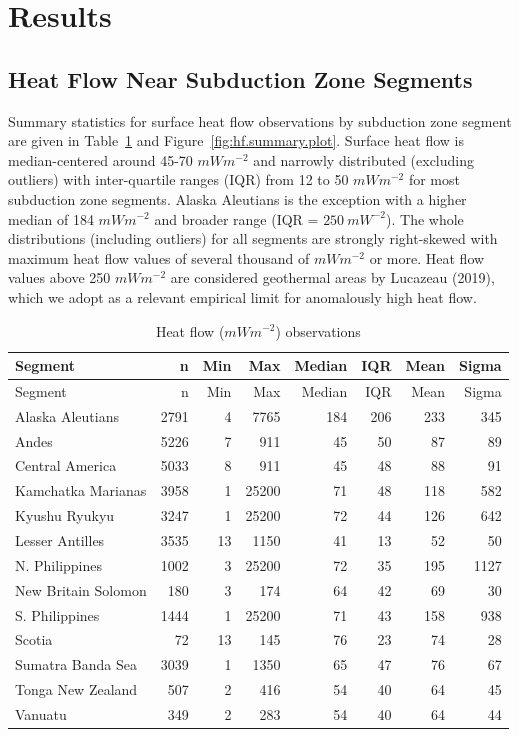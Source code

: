 \documentclass[draft,linenumbers]{agujournal2018}
\begin{document}
\section{Results}

\subsection{Heat Flow Near Subduction Zone Segments}

Summary statistics for surface heat flow observations by subduction zone
segment are given in Table~\ref{tbl:hf.summary.table} and
Figure~\ref{fig:hf.summary.plot}. Surface heat flow is median-centered
around 45-70 \(mWm^{-2}\) and narrowly distributed (excluding outliers)
with inter-quartile ranges (IQR) from 12 to 50 \(mWm^{-2}\) for most
subduction zone segments. Alaska Aleutians is the exception with a
higher median of 184 \(mWm^{-2}\) and broader range (IQR =
\(250~mW^{-2}\)). The whole distributions (including outliers) for all
segments are strongly right-skewed with maximum heat flow values of
several thousand of \(mWm^{-2}\) or more. Heat flow values above 250
\(mWm^{-2}\) are considered geothermal areas by Lucazeau (2019), which
we adopt as a relevant empirical limit for anomalously high heat flow.

\hypertarget{tbl:hf.summary.table}{}
\begin{longtable}[]{@{}lrrrrrrr@{}}
\caption{\label{tbl:hf.summary.table}Heat flow (\(mWm^{-2}\))
observations}\tabularnewline
\toprule
Segment & n & Min & Max & Median & IQR & Mean & Sigma \\
\midrule
\endfirsthead
\toprule
Segment & n & Min & Max & Median & IQR & Mean & Sigma \\
\midrule
\endhead
Alaska Aleutians & 2791 & 4 & 7765 & 184 & 206 & 233 & 345 \\
Andes & 5226 & 7 & 911 & 45 & 50 & 87 & 89 \\
Central America & 5033 & 8 & 911 & 45 & 48 & 88 & 91 \\
Kamchatka Marianas & 3958 & 1 & 25200 & 71 & 48 & 118 & 582 \\
Kyushu Ryukyu & 3247 & 1 & 25200 & 72 & 44 & 126 & 642 \\
Lesser Antilles & 3535 & 13 & 1150 & 41 & 13 & 52 & 50 \\
N. Philippines & 1002 & 3 & 25200 & 72 & 35 & 195 & 1127 \\
New Britain Solomon & 180 & 3 & 174 & 64 & 42 & 69 & 30 \\
S. Philippines & 1444 & 1 & 25200 & 71 & 43 & 158 & 938 \\
Scotia & 72 & 13 & 145 & 76 & 23 & 74 & 28 \\
Sumatra Banda Sea & 3039 & 1 & 1350 & 65 & 47 & 76 & 67 \\
Tonga New Zealand & 507 & 2 & 416 & 54 & 40 & 64 & 45 \\
Vanuatu & 349 & 2 & 283 & 54 & 40 & 64 & 44 \\
\bottomrule
\end{longtable}
\end{document}

